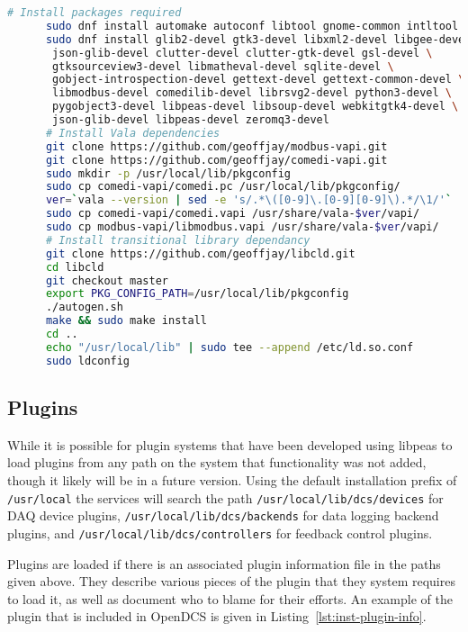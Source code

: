    \begin{lstlisting}[language=bash,
                       caption={Installation Dependencies},
                       label={lst:inst-dep}]
      # Install packages required
      sudo dnf install automake autoconf libtool gnome-common intltool gcc vala
      sudo dnf install glib2-devel gtk3-devel libxml2-devel libgee-devel \
       json-glib-devel clutter-devel clutter-gtk-devel gsl-devel \
       gtksourceview3-devel libmatheval-devel sqlite-devel \
       gobject-introspection-devel gettext-devel gettext-common-devel \
       libmodbus-devel comedilib-devel librsvg2-devel python3-devel \
       pygobject3-devel libpeas-devel libsoup-devel webkitgtk4-devel \
       json-glib-devel libpeas-devel zeromq3-devel
      # Install Vala dependencies
      git clone https://github.com/geoffjay/modbus-vapi.git
      git clone https://github.com/geoffjay/comedi-vapi.git
      sudo mkdir -p /usr/local/lib/pkgconfig
      sudo cp comedi-vapi/comedi.pc /usr/local/lib/pkgconfig/
      ver=`vala --version | sed -e 's/.*\([0-9]\.[0-9][0-9]\).*/\1/'`
      sudo cp comedi-vapi/comedi.vapi /usr/share/vala-$ver/vapi/
      sudo cp modbus-vapi/libmodbus.vapi /usr/share/vala-$ver/vapi/
      # Install transitional library dependancy
      git clone https://github.com/geoffjay/libcld.git
      cd libcld
      git checkout master
      export PKG_CONFIG_PATH=/usr/local/lib/pkgconfig
      ./autogen.sh
      make && sudo make install
      cd ..
      echo "/usr/local/lib" | sudo tee --append /etc/ld.so.conf
      sudo ldconfig
    \end{lstlisting}

  \subsection{Plugins}\label{sec:inst-plugins}

    While it is possible for plugin systems that have been developed using
    libpeas to load plugins from any path on the system that functionality was
    not added, though it likely will be in a future version. Using the default
    installation prefix of \texttt{/usr/local} the services will search the
    path \texttt{/usr/local/lib/dcs/devices} for DAQ device plugins,
    \texttt{/usr/local/lib/dcs/backends} for data logging backend plugins,
    and \texttt{/usr/local/lib/dcs/controllers} for feedback control plugins.

    Plugins are loaded if there is an associated plugin information file in the
    paths given above. They describe various pieces of the plugin that they
    system requires to load it, as well as document who to blame for their
    efforts. An example of the plugin that is included in OpenDCS is given in
    Listing~\ref{lst:inst-plugin-info}.

